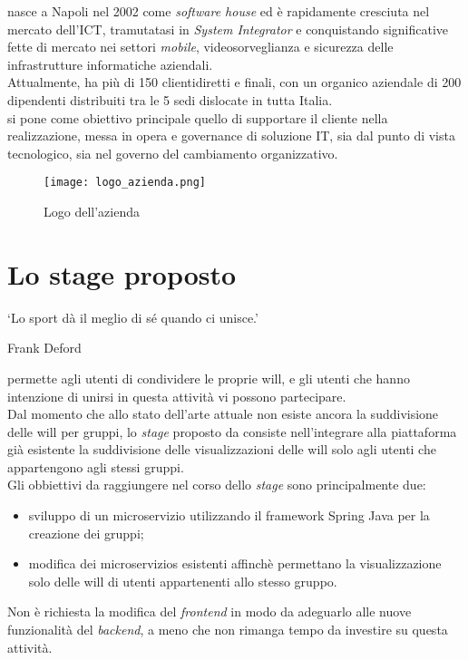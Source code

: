 \myCompany\xspace nasce a Napoli nel 2002 come \textit{software house} ed è rapidamente cresciuta nel
mercato dell'\gls{ICT}, tramutatasi in \textit{System Integrator} e conquistando significative fette di mercato nei settori 
\textit{mobile}, videosorveglianza e sicurezza delle infrastrutture informatiche aziendali. \\
Attualmente, \myCompany\xspace ha più di 150 clientidiretti e finali, con un organico aziendale
 di 200 dipendenti distribuiti tra le 5 sedi dislocate in tutta Italia.\\
\myCompany\xspace si pone come obiettivo principale quello di supportare il cliente nella realizzazione,
messa in opera e governance di soluzione IT, sia dal punto di vista tecnologico,
sia nel governo del cambiamento organizzativo.
\begin{figure}[!h] 
    \centering 
    \texttt{[image: logo\_azienda.png]} 
    \caption{Logo dell'azienda}
\end{figure}

\section{Lo stage proposto}
\epigraph{\label{eph: sport}\enquote*{Lo sport dà il meglio di sé quando ci unisce.}}{Frank Deford}
\noindent \productName permette agli utenti di condividere le proprie \gls{will}, 
e gli utenti che hanno intenzione di unirsi in questa attività vi possono partecipare.\\
Dal momento che allo stato dell'arte attuale non esiste ancora la suddivisione delle \gls{will}
per gruppi, lo \textit{stage} proposto da \myCompany consiste nell'integrare alla piattaforma già esistente
la suddivisione delle visualizzazioni delle \gls{will} solo agli utenti che 
appartengono agli stessi gruppi.\\  
Gli obbiettivi da raggiungere nel corso dello \textit{stage} sono principalmente due:
\begin{itemize}
    \item sviluppo di un \gls{microservizio} utilizzando il \gls{framework} \gls{Spring} Java per la creazione dei gruppi;
    \item modifica dei \glspl{microservizio} esistenti affinchè permettano la visualizzazione solo delle \gls{will} di utenti appartenenti allo stesso gruppo.
\end{itemize}
Non è richiesta la modifica del \textit{frontend} in modo da adeguarlo alle nuove funzionalità del \textit{backend}, a meno che 
non rimanga tempo da investire su questa attività.

